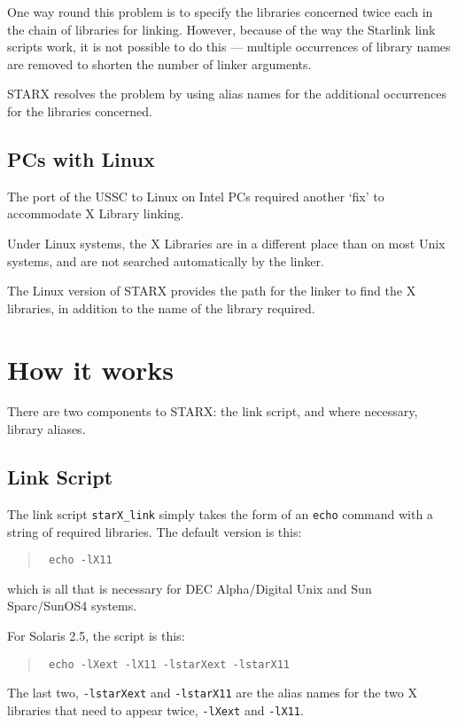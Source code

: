 One way round this problem is to specify the libraries concerned twice
each in the chain of libraries for linking. However, because of the
way the Starlink link scripts work, it is not possible to do this --- 
multiple occurrences of library names are removed to shorten the number
of linker arguments.

STARX resolves the problem by using alias names for the additional 
occurrences for the libraries concerned.

\subsection{PCs with Linux}

The port of the USSC to Linux on Intel PCs required another `fix' to 
accommodate X Library linking.  

Under Linux systems, the X Libraries are in a different place than on 
most Unix systems, and are not searched automatically by the linker.

The Linux version of STARX provides the path for the linker to find the 
X libraries, in addition to the name of the library required.

\section{How it works}

There are two components to STARX: the link script, and where
necessary, library aliases.

\subsection{Link Script}

The link script {\tt starX\_link} simply takes the form of an {\tt echo}
command with a string of required libraries.  The default version is
this:

\begin{quote}{\tt
echo -lX11}
\end{quote}

which is all that is necessary for DEC Alpha/Digital Unix and Sun Sparc/SunOS4 
systems. 

For Solaris 2.5, the script is this:

\begin{quote}{\tt
echo -lXext -lX11 -lstarXext -lstarX11}
\end{quote}

The last two, {\tt  -lstarXext} and {\tt -lstarX11} are the alias names for
the two X libraries that need to appear twice, {\tt -lXext} and {\tt -lX11}.

